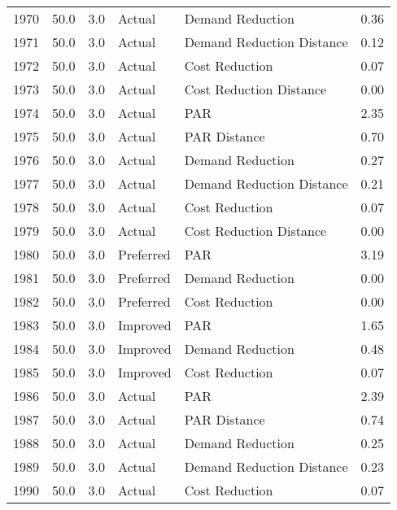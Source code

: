 \begin{longtable}{lrrllr}
1970 &         50.0 &     3.0 &         Actual &           Demand Reduction &   0.36 \\
1971 &         50.0 &     3.0 &         Actual &  Demand Reduction Distance &   0.12 \\
1972 &         50.0 &     3.0 &         Actual &             Cost Reduction &   0.07 \\
1973 &         50.0 &     3.0 &         Actual &    Cost Reduction Distance &   0.00 \\
1974 &         50.0 &     3.0 &         Actual &                        PAR &   2.35 \\
1975 &         50.0 &     3.0 &         Actual &               PAR Distance &   0.70 \\
1976 &         50.0 &     3.0 &         Actual &           Demand Reduction &   0.27 \\
1977 &         50.0 &     3.0 &         Actual &  Demand Reduction Distance &   0.21 \\
1978 &         50.0 &     3.0 &         Actual &             Cost Reduction &   0.07 \\
1979 &         50.0 &     3.0 &         Actual &    Cost Reduction Distance &   0.00 \\
1980 &         50.0 &     3.0 &      Preferred &                        PAR &   3.19 \\
1981 &         50.0 &     3.0 &      Preferred &           Demand Reduction &   0.00 \\
1982 &         50.0 &     3.0 &      Preferred &             Cost Reduction &   0.00 \\
1983 &         50.0 &     3.0 &       Improved &                        PAR &   1.65 \\
1984 &         50.0 &     3.0 &       Improved &           Demand Reduction &   0.48 \\
1985 &         50.0 &     3.0 &       Improved &             Cost Reduction &   0.07 \\
1986 &         50.0 &     3.0 &         Actual &                        PAR &   2.39 \\
1987 &         50.0 &     3.0 &         Actual &               PAR Distance &   0.74 \\
1988 &         50.0 &     3.0 &         Actual &           Demand Reduction &   0.25 \\
1989 &         50.0 &     3.0 &         Actual &  Demand Reduction Distance &   0.23 \\
1990 &         50.0 &     3.0 &         Actual &             Cost Reduction &   0.07 \\

\end{longtable}

